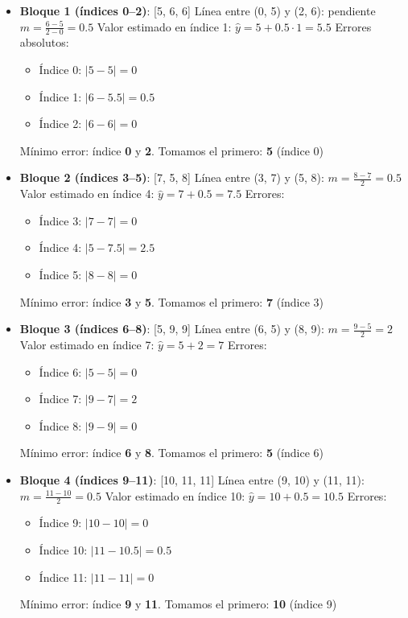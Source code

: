 \begin{itemize}
    \item \textbf{Bloque 1 (índices 0--2)}: [5, 6, 6]  
    Línea entre (0, 5) y (2, 6): pendiente \(m = \frac{6 - 5}{2 - 0} = 0.5\)  
    Valor estimado en índice 1: \( \hat{y} = 5 + 0.5 \cdot 1 = 5.5 \)  
    Errores absolutos:  
    \begin{itemize}
        \item Índice 0: $|5 - 5| = 0$
        \item Índice 1: $|6 - 5.5| = 0.5$
        \item Índice 2: $|6 - 6| = 0$
    \end{itemize}
    Mínimo error: índice \textbf{0} y \textbf{2}. Tomamos el primero: \textbf{5} (índice 0)

    \item \textbf{Bloque 2 (índices 3--5)}: [7, 5, 8]  
    Línea entre (3, 7) y (5, 8): \(m = \frac{8 - 7}{2} = 0.5\)  
    Valor estimado en índice 4: \( \hat{y} = 7 + 0.5 = 7.5 \)  
    Errores:  
    \begin{itemize}
        \item Índice 3: $|7 - 7| = 0$
        \item Índice 4: $|5 - 7.5| = 2.5$
        \item Índice 5: $|8 - 8| = 0$
    \end{itemize}
    Mínimo error: índice \textbf{3} y \textbf{5}. Tomamos el primero: \textbf{7} (índice 3)

    \item \textbf{Bloque 3 (índices 6--8)}: [5, 9, 9]  
    Línea entre (6, 5) y (8, 9): \(m = \frac{9 - 5}{2} = 2\)  
    Valor estimado en índice 7: \( \hat{y} = 5 + 2 = 7 \)  
    Errores:  
    \begin{itemize}
        \item Índice 6: $|5 - 5| = 0$
        \item Índice 7: $|9 - 7| = 2$
        \item Índice 8: $|9 - 9| = 0$
    \end{itemize}
    Mínimo error: índice \textbf{6} y \textbf{8}. Tomamos el primero: \textbf{5} (índice 6)

    \item \textbf{Bloque 4 (índices 9--11)}: [10, 11, 11]  
    Línea entre (9, 10) y (11, 11): \(m = \frac{11 - 10}{2} = 0.5\)  
    Valor estimado en índice 10: \( \hat{y} = 10 + 0.5 = 10.5 \)  
    Errores:  
    \begin{itemize}
        \item Índice 9: $|10 - 10| = 0$
        \item Índice 10: $|11 - 10.5| = 0.5$
        \item Índice 11: $|11 - 11| = 0$
    \end{itemize}
    Mínimo error: índice \textbf{9} y \textbf{11}. Tomamos el primero: \textbf{10} (índice 9)


\end{itemize}
